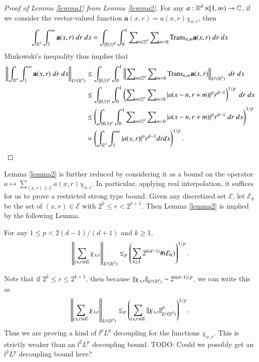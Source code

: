 \begin{proof}[Proof of Lemma \ref{lemma1} from Lemma \ref{lemma2}]
    For any $a: \operatorname{\mathbb{R}}^d \times [1,\infty) \to \operatorname{\mathbb{C}}$, if we consider the vector-valued function $\mathbf{a}(x,r) = a(x,r) \chi_{x,r}$, then
    \[ \int_{\operatorname{\mathbb{R}}^d} \int_1^\infty \mathbf{a}(x,r)\; dr\; dx = \int_{[0,1)^d} \int_0^1 \sum\nolimits_{n \in \operatorname{\mathbb{Z}}^d} \sum\nolimits_{m > 0} \text{Trans}_{n,m} \mathbf{a}(x,r)\; dr\; dx \]
    Minkowski's inequality thus implies that
    \begin{align*}
    \left\| \int_{\operatorname{\mathbb{R}}^d} \int_1^\infty \mathbf{a}(x,r)\; dr\; dx \right\|_{L^p(\operatorname{\mathbb{R}}^d)} &\leq \int_{[0,1)^d} \int_0^1 \left\| \sum\nolimits_{n \in \operatorname{\mathbb{Z}}^d} \sum\nolimits_{m > 0} \text{Trans}_{n,m} \mathbf{a}(x,r) \right\|_{L^p(\operatorname{\mathbb{R}}^d)}\; dr\; dx\\
    &\lesssim \int_{[0,1)^d} \int_0^1 \left( \sum\nolimits_{n \in \operatorname{\mathbb{Z}}^d} \sum\nolimits_{m > 0} |a(x - n, r + m)|^p r^{d-1} \right)^{1/p}\; dr\; dx\\
    &\leq \left( \int_{[0,1)^d} \int_0^1 \sum\nolimits_{n \in \operatorname{\mathbb{Z}}^d} \sum\nolimits_{m > 0} |a(x - n, r + m)|^p r^{d-1}\; dr\; dx \right)^{1/p}\\
    &= \left( \int_{\operatorname{\mathbb{R}}^d} \int_1^\infty |a(x,r)|^p r^{d-1} dr dx \right)^{1/p}. \qedhere
    \end{align*}
\end{proof}

Lemma \ref{lemma2} is further reduced by considering it as a bound on the operator $a \mapsto \sum_{(x,r) \in \mathcal{E}} a(x,r) \chi_{x,r}$. In particular, applying real interpolation, it suffices for us to prove a restricted strong type bound. Given any discretized set $\mathcal{E}$, let $\mathcal{E}_k$ be the set of $(x,r) \in \mathcal{E}$ with $2^k \leq r < 2^{k+1}$. Then Lemma \ref{lemma2} is implied by the following Lemma.

\begin{lemma} \label{lemma3}
    For any $1 \leq p < 2(d - 1)/(d+1)$ and $k \geq 1$,
    \[ \left\| \sum_{(x,r) \in \mathcal{E}} \chi_{x,r} \right\|_{L^p(\operatorname{\mathbb{R}}^d)} \lesssim_p \left( \sum_{k \geq 1} 2^{k(d-1)} \#(\mathcal{E}_k) \right)^{1/p}. \]
\end{lemma}

\begin{remark}
    Note that if $2^k \leq r \leq 2^{k+1}$, then because $\| \chi_{x,r} \|_{L^p(\operatorname{\mathbb{R}}^d)} \sim 2^{k(d-1)/p}$, we can write this as
    \[ \left\| \sum_{(x,r) \in \mathcal{E}} \chi_{x,r} \right\|_{L^p(\operatorname{\mathbb{R}}^d)} \lesssim_p \left( \sum_{(x,r) \in \mathcal{E}} \| \chi_{x,r} \|_{L^p(\operatorname{\mathbb{R}}^d)}^p \right)^{1/p}. \]
    Thus we are proving a kind of $l^p L^p$ decoupling for the functions $\chi_{x,r}$. This is strictly weaker than an $l^2 L^p$ decoupling bound. TODO: Could we possibly get an $l^2 L^p$ decoupling bound here?
\end{remark}

